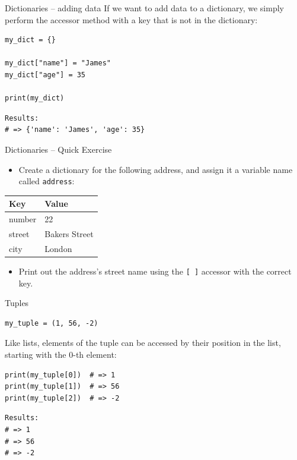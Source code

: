 \documentclass[10pt]{beamer}
\begin{document}
\begin{frame}[label={sec:org943efda},fragile]{Dictionaries -- adding data}
 If we want to add data to a dictionary, we simply perform the accessor method with a
key that is not in the dictionary:

\begin{verbatim}
my_dict = {}

my_dict["name"] = "James"
my_dict["age"] = 35

print(my_dict)
\end{verbatim}

\begin{verbatim}
Results: 
# => {'name': 'James', 'age': 35}
\end{verbatim}
\end{frame}

\begin{frame}[label={sec:orgf2c4e9e},fragile]{Dictionaries -- Quick Exercise}
 \begin{itemize}
\item Create a dictionary for the following address, and assign it a variable name
called \texttt{address}:
\end{itemize}

\begin{center}
\begin{tabular}{ll}
Key & Value\\
\hline
number & 22\\
street & Bakers Street\\
city & London\\
\end{tabular}
\end{center}

\begin{itemize}
\item Print out the address's street name using the \texttt{[ ]} accessor with the correct key.
\end{itemize}
\end{frame}

\begin{frame}[label={sec:orgb62dca0},fragile]{Tuples}
 \begin{verbatim}
my_tuple = (1, 56, -2)
\end{verbatim}

Like lists, elements of the tuple can be accessed by their position in the list,
starting with the 0-th element:

\begin{verbatim}
print(my_tuple[0])  # => 1
print(my_tuple[1])  # => 56
print(my_tuple[2])  # => -2
\end{verbatim}

\begin{verbatim}
Results: 
# => 1
# => 56
# => -2
\end{verbatim}
\end{frame}
\end{document}

